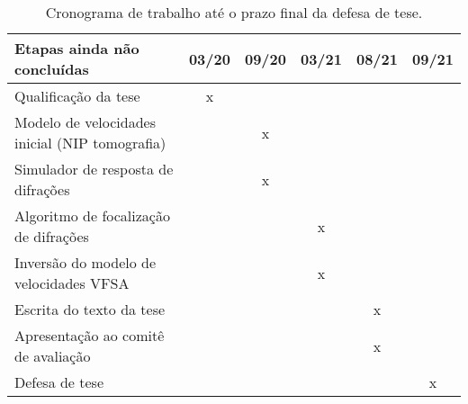    \begin{table}[H]
      \caption{Cronograma de trabalho até o prazo final da defesa de tese.}
      \centering
      
      \begin{tabular}{|p{6cm}|c|c|c|c|c|}

      \hline
      \textbf{Etapas ainda não concluídas} & 03/20 & 09/20 & 03/21 & 08/21 & 09/21 \\ \hline
      Qualificação da tese & x & & & & \\ \hline
      Modelo de velocidades inicial (NIP tomografia) & & x & & & \\ \hline
      Simulador de resposta de difrações & & x & & & \\ \hline
      Algoritmo de focalização de difrações & & & x & & \\ \hline
      Inversão do modelo de velocidades VFSA & & & x & & \\ \hline
      Escrita do texto da tese & & & & x & \\ \hline
      Apresentação ao comitê de avaliação & & & & x & \\ \hline
      Defesa de tese & & & & & x \\
      \hline
      
      \end{tabular}
  \end{table}
  
